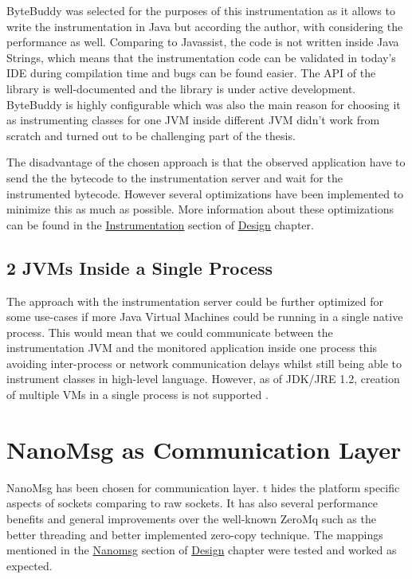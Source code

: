 ByteBuddy was selected for the purposes of this instrumentation as it allows to write the instrumentation in Java but according the author, with considering the performance as well. Comparing to Javassist, the code is not written inside Java Strings, which means that the instrumentation code can be validated in today's IDE during compilation time and bugs can be found easier. The API of the library is well-documented and the library is under active development. ByteBuddy is highly configurable which was also the main reason for choosing it as instrumenting classes for one JVM inside different JVM didn't work from scratch and turned out to be challenging part of the thesis.

The disadvantage of the chosen approach is that the observed application have to send the the bytecode to the instrumentation server and wait for the instrumented bytecode. However several optimizations have been implemented to minimize this as much as possible. More information about these optimizations can be found in the \hyperref[sec:inst_server]{Instrumentation} section of \hyperref[chap:design]{Design} chapter.

\subsection{2 JVMs Inside a Single Process}
The approach with the instrumentation server could be further optimized for some use-cases if more Java Virtual Machines could be running in a single native process. This would mean that we could communicate between the instrumentation JVM and the monitored application inside one process this avoiding inter-process or network communication delays whilst still being able to instrument classes in high-level language. However, as of JDK/JRE 1.2, creation of multiple VMs in a single process is not supported \cite{MoreJVMOnceProccess}.

\section{NanoMsg as Communication Layer}
NanoMsg has been chosen for communication layer. t hides the platform specific aspects of sockets comparing to raw sockets. It has also several performance benefits and general improvements over the well-known ZeroMq such as the better threading and better implemented zero-copy technique. The mappings mentioned in the \hyperref[sec:nanomsg]{Nanomsg} section of \hyperref[chap:background]{Design} chapter were tested and worked as expected.




